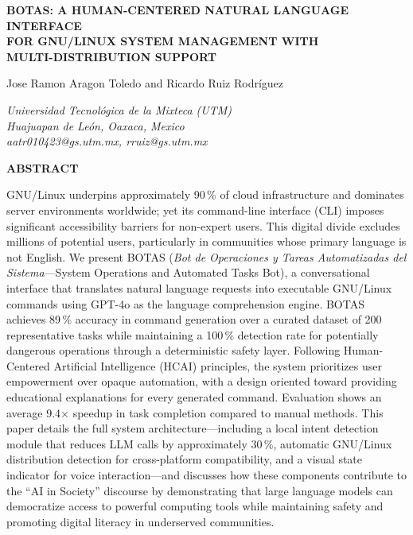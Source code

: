 \documentclass[10pt,a4paper]{article}
\begin{document}

{
\centering
\fontsize{16}{19.2}\bfseries
BOTAS: A HUMAN-CENTERED NATURAL LANGUAGE INTERFACE\\
FOR GNU/LINUX SYSTEM MANAGEMENT WITH\\
MULTI-DISTRIBUTION SUPPORT\par
\vspace{24pt}
}

{
\centering
\fontsize{11}{13.2}\selectfont
Jose Ramon Aragon Toledo and Ricardo Ruiz Rodr\'{i}guez\par
\vspace{6pt}
\fontsize{9}{10.8}\itshape
Universidad Tecnol\'{o}gica de la Mixteca (UTM)\\
Huajuapan de Le\'{o}n, Oaxaca, Mexico\\
aatr010423@gs.utm.mx, rruiz@gs.utm.mx\par
\vspace{24pt}
}

{
\vspace{18pt}
\noindent\fontsize{9}{10.8}\bfseries ABSTRACT\par
\vspace{6pt}
\fontsize{9}{10.8}\selectfont
\noindent
GNU/Linux underpins approximately 90\,\% of cloud infrastructure and dominates server environments worldwide; yet its command-line interface (CLI) imposes significant accessibility barriers for non-expert users. This digital divide excludes millions of potential users, particularly in communities whose primary language is not English. We present BOTAS (\textit{Bot de Operaciones y Tareas Automatizadas del Sistema}---System Operations and Automated Tasks Bot), a conversational interface that translates natural language requests into executable GNU/Linux commands using GPT-4o as the language comprehension engine. BOTAS achieves 89\,\% accuracy in command generation over a curated dataset of 200 representative tasks while maintaining a 100\,\% detection rate for potentially dangerous operations through a deterministic safety layer. Following Human-Centered Artificial Intelligence (HCAI) principles, the system prioritizes user empowerment over opaque automation, with a design oriented toward providing educational explanations for every generated command. Evaluation shows an average 9.4$\times$ speedup in task completion compared to manual methods. This paper details the full system architecture---including a local intent detection module that reduces LLM calls by approximately 30\,\%, automatic GNU/Linux distribution detection for cross-platform compatibility, and a visual state indicator for voice interaction---and discusses how these components contribute to the ``AI in Society'' discourse by demonstrating that large language models can democratize access to powerful computing tools while maintaining safety and promoting digital literacy in underserved communities.\par
}
\end{document}
